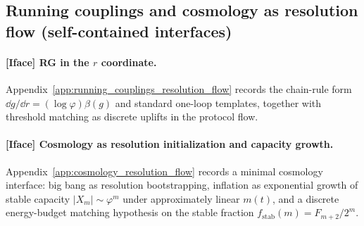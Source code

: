 \subsection{Running couplings and cosmology as resolution flow (self-contained interfaces)}
\label{subsec:tick_cap_rg_cosmo}

\paragraph{[Iface] RG in the \texorpdfstring{$r$}{r} coordinate.}
Appendix~\ref{app:running_couplings_resolution_flow} records the chain-rule form $\dd g/\dd r=(\log\varphi)\beta(g)$ and standard one-loop templates, together with threshold matching as discrete uplifts in the protocol flow.

\paragraph{[Iface] Cosmology as resolution initialization and capacity growth.}
Appendix~\ref{app:cosmology_resolution_flow} records a minimal cosmology interface: big bang as resolution bootstrapping, inflation as exponential growth of stable capacity $|X_m|\sim \varphi^m$ under approximately linear $m(t)$, and a discrete energy-budget matching hypothesis on the stable fraction $f_{\mathrm{stab}}(m)=F_{m+2}/2^m$.


